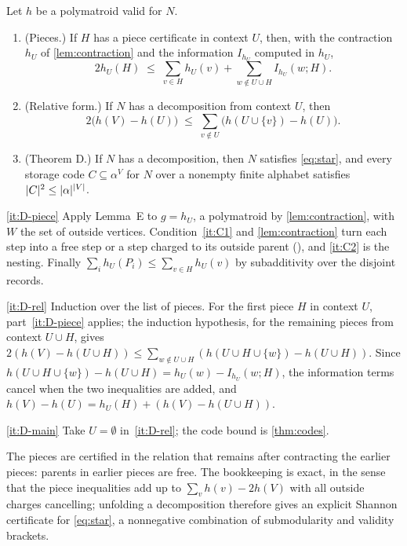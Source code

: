 \begin{theorem}\label{thm:D}
Let $h$ be a polymatroid valid for $N$.
\begin{enumerate}[label=(\alph*)]
\item\label{it:D-piece} (Pieces.) If $H$ has a piece certificate in context $U$, then, with the contraction $h_U$ of
\cref{lem:contraction} and the information $I_{h_U}$ computed in $h_U$,
\[
  2h_U(H)\;\le\;\sum_{v\in H}h_U(v)+\sum_{w\notin U\cup H}I_{h_U}(w;H).
\]
\item\label{it:D-rel} (Relative form.) If $N$ has a decomposition from context $U$, then
\[
  2\bigl(h(V)-h(U)\bigr)\;\le\;\sum_{v\notin U}\bigl(h(U\cup\{v\})-h(U)\bigr).
\]
\item\label{it:D-main} (Theorem D.) If $N$ has a decomposition, then $N$ satisfies \eqref{eq:star}, and every storage
code $C\subseteq\alpha^V$ for $N$ over a nonempty finite alphabet satisfies $\lvert C \rvert^2\le\lvert \alpha \rvert^{\lvert V \rvert}$.
\end{enumerate}
\end{theorem}

\begin{outline}
\ref{it:D-piece} Apply Lemma~E to $g=h_U$, a polymatroid by \cref{lem:contraction}, with $W$ the set of outside
vertices. Condition~\ref{it:C1} and \cref{lem:contraction} turn each step into a free step or a step charged to its
outside parent (), and \ref{it:C2} is the nesting. Finally
$\sum_ih_U(P_i)\le\sum_{v\in H}h_U(v)$ by subadditivity over the disjoint records.

\ref{it:D-rel} Induction over the list of pieces. For the first piece $H$ in context $U$, part~\ref{it:D-piece} applies;
the induction hypothesis, for the remaining pieces from context $U\cup H$, gives
$2(h(V)-h(U\cup H))\le\sum_{w\notin U\cup H}(h(U\cup H\cup\{w\})-h(U\cup H))$. Since
$h(U\cup H\cup\{w\})-h(U\cup H)=h_U(w)-I_{h_U}(w;H)$, the information terms cancel when the two inequalities are added,
and $h(V)-h(U)=h_U(H)+(h(V)-h(U\cup H))$.

\ref{it:D-main} Take $U=\emptyset$ in~\ref{it:D-rel}; the code bound is \cref{thm:codes}.
\end{outline}

The pieces are certified in the relation that remains after contracting the earlier pieces: parents in earlier
pieces are free. The bookkeeping is exact, in the sense that the piece inequalities add up to
$\sum_vh(v)-2h(V)$ with all outside charges cancelling; unfolding a decomposition therefore gives an explicit Shannon
certificate for \eqref{eq:star}, a nonnegative combination of submodularity and validity brackets.

